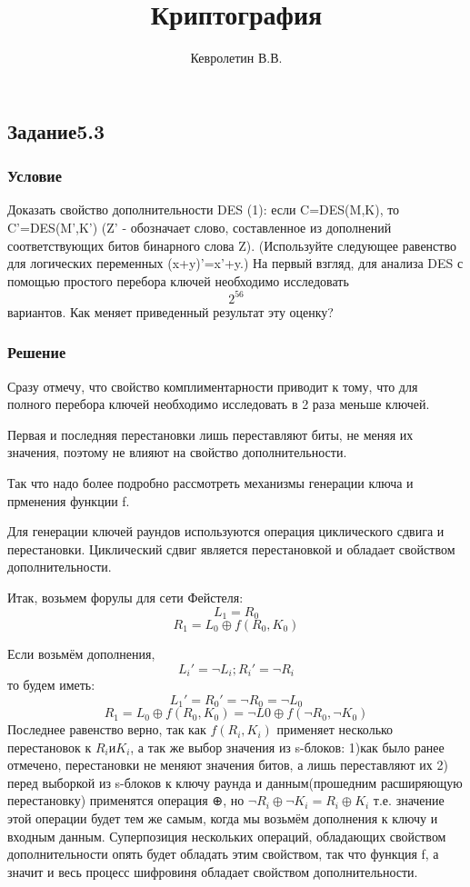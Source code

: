 \documentclass[10pt,a4paper]{article}
\author{Кевролетин В.В.}
\title{Криптография}
\begin{document}
\maketitle

\subsection*{Задание5.3}
\subsubsection*{Условие}
Доказать свойство дополнительности DES (1): если C=DES(M,K), то
C'=DES(M',K') (Z' - обозначает слово, составленное из дополнений
соответствующих битов бинарного слова Z). (Используйте следующее
равенство для логических переменных (x+y)'=x'+y.) На первый взгляд,
для анализа DES с помощью простого перебора ключей необходимо
исследовать $$ 2^{56}  $$ вариантов. Как меняет приведенный результат эту
оценку?
\subsubsection*{Решение}

Сразу отмечу, что свойство комплиментарности приводит к тому, что для
полного перебора ключей необходимо исследовать в 2 раза меньше ключей.

Первая и последняя перестановки лишь переставляют биты, не меняя их
значения, поэтому не влияют на свойство дополнительности.

Так что надо более подробно рассмотреть механизмы генерации ключа и
прменения функции f.

Для генерации ключей раундов используются операция циклического сдвига
и перестановки. Циклический сдвиг является перестановкой и обладает
свойством дополнительности.

Итак, возьмем форулы для сети Фейстеля:
$$ L_1 = R_0 $$ 
$$ R_1 = L_0 ⊕ f(R_0 , K_0 ) $$

Если возьмём дополнения, 
$$ L_i' = \neg L_i ; R_i' = \neg R_i $$
то будем иметь:
$$ L_1' = R_0' = \neg R_0 = \neg L_0 $$
$$ R_1 = L_0 ⊕ f (R_0 , K_0 ) = \neg L0 ⊕ f (\neg R_0 ,\neg K_0) $$
Последнее равенство верно, так как $ f(R_i,K_i) $ применяет несколько
перестановок к $ R_i и K_i $, а так же выбор значения из
s-блоков: 1)как было ранее отмечено,
перестановки не меняют значения битов, а лишь переставляют их 2) перед
выборкой из s-блоков к ключу раунда и данным(прошедним расширяющую
перестановку) применятся операция  ⊕, но 
$ \neg R_i ⊕ \neg K_i = R_i ⊕ K_i $ т.е.
значение этой операции будет
тем же самым, когда мы возьмём дополнения к ключу и входным данным.
Суперпозиция нескольких операций, обладающих свойством
дополнительности опять будет обладать этим свойством, так что функция
f, а значит и весь процесс шифровиня обладает свойством
дополнительности.
\end{document}
